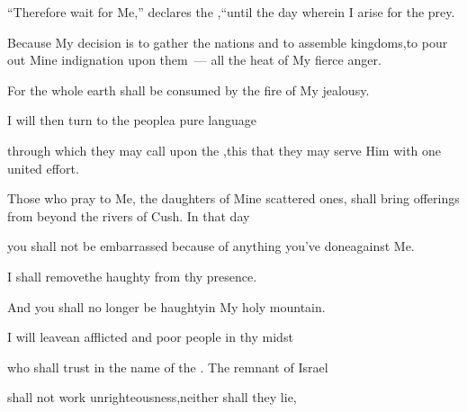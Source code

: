 
\begin{inparaenum}
  \pa{} ``Therefore wait for Me,'' declares the \lord,\pa{}``until the day %
  wherein I arise for the prey.%

  \pa{}Because My decision is to gather the nations and to assemble kingdoms,\pa{}to pour out Mine indignation upon them~--- all the heat of My fierce anger.%

  \pa{}For the whole earth shall be consumed by the fire of My jealousy.%

  \pa{}  I will then turn to the people\pa{}a pure language%

  \pa{}through which they may call upon the \lord,\pa{}this %
  that they may serve Him with one united effort.%

  \pa{} Those who pray to Me, the daughters of Mine scattered ones, shall bring offerings from beyond the rivers of Cush.  In that day%

  \pa{}you shall not be embarrassed because of anything you've done\pa{}against Me.%

  \pa{} I shall remove\pa{}the haughty from thy presence.%

  \pa{}And you shall no longer be haughty\pa{}in My holy mountain.%

  \pa{} I will leave\pa{}an afflicted and poor people in thy midst%

  \pa{}who shall trust in the name of the \lord.%
   The remnant of Israel%

  \pa{}shall not work unrighteousness,\pa{}neither shall they lie,%


\end{inparaenum}
